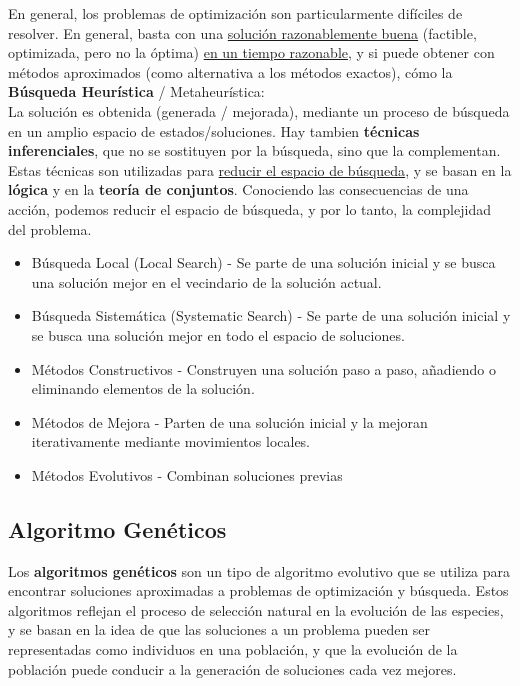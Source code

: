 
En general, los problemas de optimización son particularmente difíciles de resolver.
En general, basta con una \ul{solución razonablemente buena} (factible, optimizada, pero no la
óptima) \ul{en un tiempo razonable}, y si puede obtener con métodos aproximados (como alternativa a los métodos exactos), cómo la \textbf{Búsqueda Heurística} / Metaheurística:\\
 La solución es obtenida (generada / mejorada), mediante un proceso de búsqueda en un amplio espacio de estados/soluciones.
Hay tambien \textbf{técnicas inferenciales}, que no se sostituyen por la búsqueda, sino que la complementan. Estas técnicas son utilizadas para \ul{reducir el espacio de búsqueda}, y se basan en la \textbf{lógica} y en la \textbf{teoría de conjuntos}.
Conociendo las consecuencias de una acción, podemos reducir el espacio de búsqueda, y por lo tanto, la complejidad del problema.

\begin{itemize}
   \item Búsqueda Local (Local Search) - Se parte de una solución inicial y se busca una solución mejor en el vecindario de la solución actual.
   \item Búsqueda Sistemática (Systematic Search) - Se parte de una solución inicial y se busca una solución mejor en todo el espacio de soluciones.
\end{itemize}

\begin{itemize}
   \item Métodos Constructivos - Construyen una solución paso a paso, añadiendo o eliminando elementos de la solución.
   \item Métodos de Mejora - Parten de una solución inicial y la mejoran iterativamente mediante movimientos locales.
   \item Métodos Evolutivos - Combinan soluciones previas
\end{itemize}


\subsection{Algoritmo Genéticos}
Los \textbf{algoritmos genéticos} son un tipo de algoritmo evolutivo que se utiliza para encontrar soluciones aproximadas a problemas de optimización y búsqueda. Estos algoritmos reflejan el proceso de selección natural en la evolución de las especies, y se basan en la idea de que las soluciones a un problema pueden ser representadas como individuos en una población, y que la evolución de la población puede conducir a la generación de soluciones cada vez mejores.

